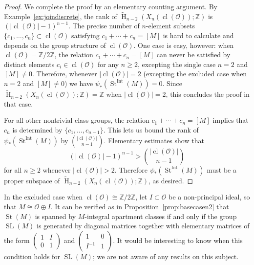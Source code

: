 \documentclass[11 pt]{article}
\theoremstyle{plain}
\theoremstyle{definition}
\numberwithin{equation}{section}
\DeclareMathOperator{\SL}{SL}
\newcommand\Z{\ensuremath{\mathbb{Z}}}
\DeclareMathOperator{\HH}{H}
\renewcommand{\O}{\mathcal{O}}
\DeclareMathOperator{\class}{cl}
\newcommand{\cl}{\class}
\DeclareMathOperator{\St}{St}
\newcommand\abs[1]{\left\lvert#1\right\rvert}
\DeclareMathOperator{\Int}{Int}
\newcommand\iso{\cong}
\begin{document}
\begin{proof}
We complete the proof by an elementary counting argument. By Example~\ref{ex:joindiscrete}, the rank of
$\widetilde{\HH}_{n-2}(X_n(\class(\O));\Z)$ is $(\abs{\class(\O)}-1)^{n-1}$.  The precise number of 
$n$-element subsets $\{c_1,\ldots,c_n\}\subset \class(\O)$ satisfying 
$c_1+\cdots+c_n=[M]$ is hard to calculate and depends on the group structure of $\class(\O)$. 
One case is easy, however: when $\class(\O)=\Z/2\Z$, the relation $c_1+\cdots+c_n=[M]$ 
can never be satisfied by distinct elements $c_i\in \class(\O)$ for any $n\geq 2$, excepting the single case $n=2$ and $[M]\neq 0$. Therefore, whenever $\abs{\class(\O)}=2$ (excepting the excluded case when $n=2$ and $[M]\neq 0$) we have $\psi_{\ast}(\St^{\Int}(M)) = 0$. Since 
$\widetilde{\HH}_{n-2}(X_n(\class(\O));\Z) = \Z$ when $\abs{\class(\O)}=2$, this concludes the proof in that case.

For all other nontrivial class groups, the relation $c_1+\cdots+c_n=[M]$ implies that 
$c_n$ is determined by $\{c_1,\ldots,c_{n-1}\}$.  This lets us bound the rank of 
$\psi_{\ast}(\St^{\Int}(M))$ by $\binom{\abs{\class(\O)}}{n-1}$.
Elementary estimates show that
\[(\abs{\class(\O)}-1)^{n-1} > \binom{\abs{\class(\O)}}{n-1}\] 
for all $n \geq 2$ whenever $\abs{\class(\O)}>2$. Therefore $\psi_{\ast}(\St^{\Int}(M))$ must be a proper subspace of
$\widetilde{\HH}_{n-2}(X_n(\class(\O));\Z)$, as desired.
\end{proof}
 In the excluded case when $\cl(\O)\iso \Z/2\Z$, let $I\subset \O$ be a non-principal ideal, so that $M\iso \O\oplus I$. It can be verified as in Proposition~\ref{prop:basecasen2} that $\St(M)$ is spanned by $M$-integral apartment classes if and only if the group $\SL(M)$ is generated by diagonal matrices together with elementary matrices of the form ${\scriptstyle \begin{pmatrix}1&I\\0&1\end{pmatrix}}$ and ${\scriptstyle \begin{pmatrix}1&0\\I^{-1}&1\end{pmatrix}}$. It would be interesting to know when this  condition holds for $\SL(M)$; we are not aware of any results on this subject.
\end{document}
